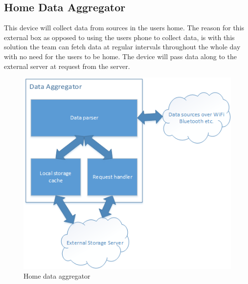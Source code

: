 \subsection{Home Data Aggregator}
This device will collect data from sources in the users home. The reason for this external box as opposed to using the users phone to collect data, is with this solution the team can fetch data at regular intervals throughout the whole day with no need for the users to be home. The device will pass data along to the external server at request from the server.

\begin{figure}[H]
\includegraphics[width=\textwidth]{ch/projectPlan/fig/home.png}
\caption{Home data aggregator}
\end{figure}
